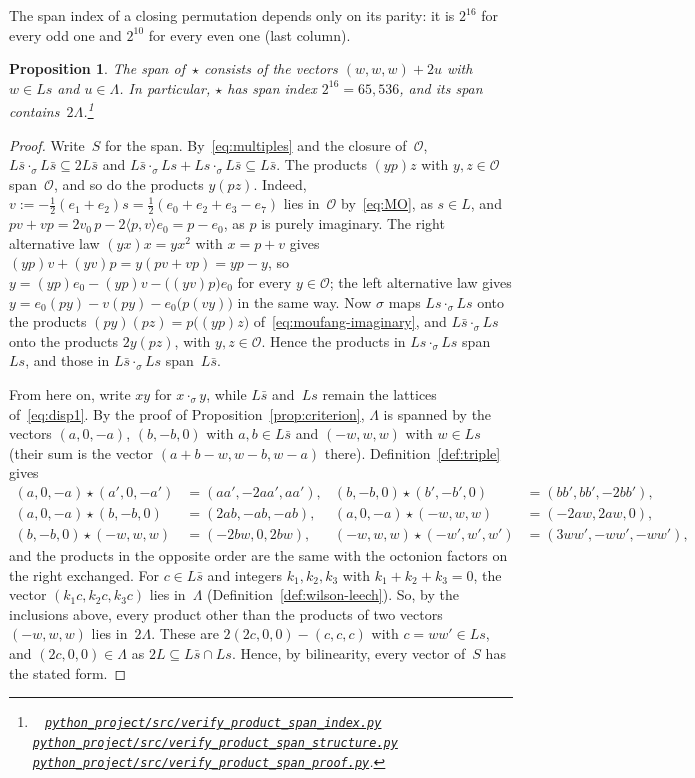 \documentclass[twoside,english]{paper}
\numberwithin{equation}{section}
\numberwithin{figure}{section}
\newtheorem{proposition}[theorem]{Proposition}
\theoremstyle{definition}
\theoremstyle{remark}
\newcommand{\MO}{\mathcal{O}}         %
\newcommand{\LL}{\Lambda}             %
\newcommand{\scriptref}[1]{\cite{repo}~%
  \href{https://github.com/koeplinger/leech\_alg/blob/main/python\_project/src/#1}%
  {\nolinkurl{python_project/src/#1}}}
\begin{document}
The span index of a closing permutation depends only on its parity:
it is $2^{16}$ for every odd one and $2^{10}$ for every even one (last
column).

\begin{proposition}\label{prop:span}
The span of~$\star$ consists of the vectors $(w, w, w) + 2u$ with $w \in
Ls$ and $u \in \LL$.  In particular, $\star$ has span index $2^{16} =
65{,}536$, and its span contains~$2\LL$.\footnote{\scriptref{verify\_product\_span\_index.py}
\scriptref{verify\_product\_span\_structure.py}
\scriptref{verify\_product\_span\_proof.py}.}
\end{proposition}

\begin{proof}
Write~$S$ for the span.  By~\eqref{eq:multiples} and the closure
of~$\MO$, $L\bar s \cdot_\sigma L\bar s \subseteq 2L\bar s$ and $L\bar s
\cdot_\sigma Ls + Ls \cdot_\sigma L\bar s \subseteq L\bar s$.  The
products $(yp)z$ with $y, z \in \MO$ span~$\MO$, and so do the products
$y(pz)$.  Indeed, $v := -\tfrac12(e_1 + e_2)s = \tfrac12(e_0 + e_2 + e_3 -
e_7)$ lies in~$\MO$ by~\eqref{eq:MO}, as $s \in L$, and $pv + vp = 2v_0\,p
- 2\langle p, v\rangle e_0 = p - e_0$, as $p$ is purely imaginary.  The
right alternative law $(yx)x = yx^2$ with $x = p + v$ gives $(yp)v + (yv)p
= y(pv + vp) = yp - y$, so $y = (yp)e_0 - (yp)v - \bigl((yv)p\bigr)e_0$
for every $y \in \MO$; the left alternative law gives $y = e_0(py) - v(py)
- e_0\bigl(p(vy)\bigr)$ in the same way.  Now $\sigma$ maps
$Ls \cdot_\sigma Ls$ onto the products $(py)(pz) = p\bigl((yp)z\bigr)$
of~\eqref{eq:moufang-imaginary}, and $L\bar s \cdot_\sigma Ls$ onto the
products $2y(pz)$, with $y, z \in \MO$.  Hence the products in $Ls
\cdot_\sigma Ls$ span~$Ls$, and those in $L\bar s \cdot_\sigma Ls$
span~$L\bar s$.

From here on, write $xy$ for $x \cdot_\sigma y$, while $L\bar s$ and~$Ls$
remain the lattices of~\eqref{eq:disp1}.  By the proof of
Proposition~\ref{prop:criterion}, $\LL$ is spanned by the vectors $(a, 0,
-a)$, $(b, -b, 0)$ with $a, b \in L\bar s$ and $(-w, w, w)$ with $w \in
Ls$ (their sum is the vector $(a + b - w, w - b, w - a)$ there).
Definition~\ref{def:triple} gives
\begin{align*}
  (a, 0, -a) \star (a', 0, -a') &= (aa', -2aa', aa'), &
  (b, -b, 0) \star (b', -b', 0) &= (bb', bb', -2bb'), \\
  (a, 0, -a) \star (b, -b, 0) &= (2ab, -ab, -ab), &
  (a, 0, -a) \star (-w, w, w) &= (-2aw, 2aw, 0), \\
  (b, -b, 0) \star (-w, w, w) &= (-2bw, 0, 2bw), &
  (-w, w, w) \star (-w', w', w') &= (3ww', -ww', -ww'),
\end{align*}
and the products in the opposite order are the same with the octonion
factors on the right exchanged.  For $c \in L\bar s$ and integers $k_1,
k_2, k_3$ with $k_1 + k_2 + k_3 = 0$, the vector $(k_1 c, k_2 c, k_3 c)$
lies in~$\LL$ (Definition~\ref{def:wilson-leech}).  So, by the inclusions
above, every product other than the products of two vectors $(-w, w, w)$
lies in~$2\LL$.  These are $2(2c, 0, 0) - (c, c, c)$ with $c = ww' \in
Ls$, and $(2c, 0, 0) \in \LL$ as $2L \subseteq L\bar s \cap Ls$.  Hence,
by bilinearity, every vector of~$S$ has the stated form.


\end{proof}
\end{document}
